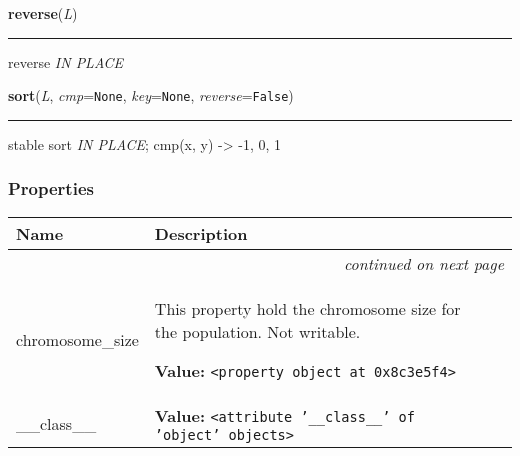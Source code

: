     \label{list:reverse}

    \vspace{0.5ex}

    \begin{boxedminipage}{\textwidth}

    \raggedright \textbf{reverse}(\textit{L})

    \vspace{-1.5ex}

    \rule{\textwidth}{0.5\fboxrule}

reverse \emph{IN PLACE}
    \vspace{1ex}

    \end{boxedminipage}

    \label{list:sort}

    \vspace{0.5ex}

    \begin{boxedminipage}{\textwidth}

    \raggedright \textbf{sort}(\textit{L}, \textit{cmp}=\texttt{None}, \textit{key}=\texttt{None}, \textit{reverse}=\texttt{False})

    \vspace{-1.5ex}

    \rule{\textwidth}{0.5\fboxrule}

stable sort \emph{IN PLACE};
cmp(x, y) -{\textgreater} -1, 0, 1
    \vspace{1ex}

    \end{boxedminipage}



  \subsubsection{Properties}

\begin{longtable}{|p{}|p{}|l}
\cline{1-2}
\cline{1-2} \centering \textbf{Name} & \centering \textbf{Description}& \\
\cline{1-2}
\endhead\cline{1-2}\multicolumn{3}{r}{\small\textit{continued on next page}}\\\endfoot\cline{1-2}
\endlastfoot\raggedright c\-h\-r\-o\-m\-o\-s\-o\-m\-e\-\_\-s\-i\-z\-e\- & \raggedright This property hold the chromosome size for the population. Not
writable.

\textbf{Value:} 
{\tt {\textless}property object at 0x8c3e5f4{\textgreater}}&\\
\cline{1-2}
\raggedright \_\-\_\-c\-l\-a\-s\-s\-\_\-\_\- & \raggedright \textbf{Value:} 
{\tt {\textless}attribute '\_\_class\_\_' of 'object' objects{\textgreater}}&\\
\cline{1-2}
\end{longtable}



